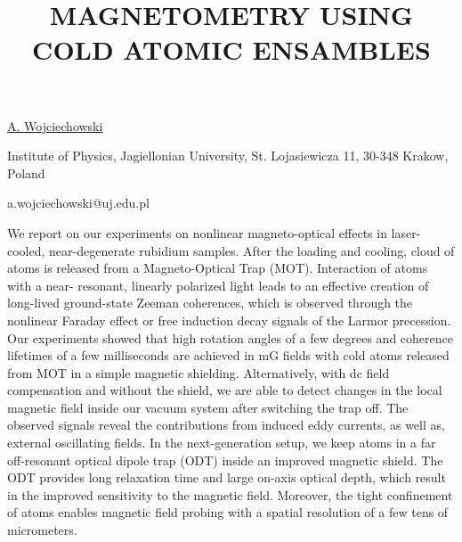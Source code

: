 \title{MAGNETOMETRY USING COLD ATOMIC ENSAMBLES}

\underline{A. Wojciechowski} 

{\normalsize{\vspace{-4mm}
Institute of Physics,
Jagiellonian University,
St. Lojasiewicza 11,
30-348 Krakow, Poland

\email a.wojciechowski@uj.edu.pl}}

We report on our experiments on nonlinear magneto-optical effects in laser-cooled, near-degenerate rubidium samples. After
the loading and cooling, cloud of atoms is released from a Magneto-Optical Trap (MOT). Interaction of atoms with a near-
resonant, linearly polarized light leads to an effective creation of long-lived ground-state Zeeman coherences, which is
observed through the nonlinear Faraday effect or free induction decay signals of the Larmor precession. Our experiments
showed that high rotation angles of a few degrees and coherence lifetimes of a few milliseconds are achieved in mG fields
with cold atoms released from MOT in a simple magnetic shielding. Alternatively, with dc field compensation and without the
shield, we are able to detect changes in the local magnetic field inside our vacuum system after switching the trap off. The
observed signals reveal the contributions from induced eddy currents, as well as, external oscillating fields.
In the next-generation setup, we keep atoms in a far off-resonant optical dipole trap (ODT) inside an improved magnetic
shield. The ODT provides long relaxation time and large on-axis optical depth, which result in the improved sensitivity to the
magnetic field. Moreover, the tight confinement of atoms enables magnetic field probing with a spatial resolution of a few tens
of micrometers.

\vspace{\baselineskip}
